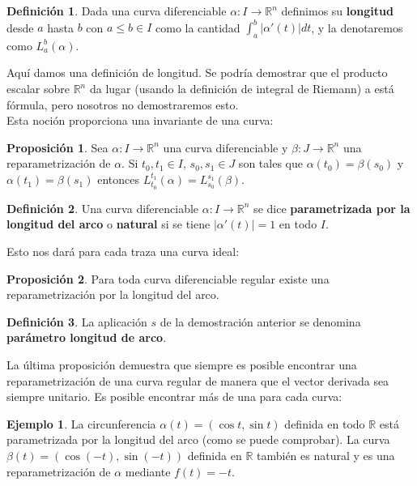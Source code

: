 \documentclass{article}
\theoremstyle{definition}
\newtheorem{prop}{Proposición}
\newtheorem{define}{Definición}
\newtheorem{ejem}{Ejemplo}
\newcommand{\reales}{\mathbb{R}}
\begin{document}
\begin{define}
	Dada una curva diferenciable $\alpha: I \rightarrow \reales^{n}$ definimos su \textbf{longitud} desde $a$ hasta $b$ con $a\leq b \in I$ como la cantidad $\int_a^b |\alpha' (t)| dt$, y la denotaremos como $L_{a}^{b} (\alpha)$. 
\end{define}

Aquí damos una definición de longitud. Se podría demostrar que el producto escalar sobre $\reales^{n}$ da lugar (usando la definición de integral de Riemann) a está fórmula, pero nosotros no demostraremos esto.\\ 
Esta noción proporciona una invariante de una curva:

\begin{prop}
	Sea $\alpha: I \rightarrow \reales^{n}$ una curva diferenciable y $\beta: J \rightarrow \reales^{n}$ una reparametrización de $\alpha$. Si $t_0, t_1 \in I$, $s_0, s_1 \in J$ son tales que $\alpha(t_0) = \beta(s_0)$ y $\alpha(t_1) = \beta(s_1)$ entonces $L_{t_0}^{t_1} (\alpha) = L_{s_0}^{s_1} (\beta)$.
\end{prop}

\begin{define}
	Una curva diferenciable $\alpha: I \rightarrow \reales^{n}$ se dice \textbf{parametrizada por la longitud del arco} o \textbf{natural} si se tiene $|\alpha' (t)| = 1$ en todo $I$.
\end{define}

Esto nos dará para cada traza una curva ideal:

\begin{prop}	
	Para toda curva diferenciable regular existe una reparametrización por la longitud del arco.
\end{prop}

\begin{define}
	La aplicación $s$ de la demostración anterior se denomina \textbf{parámetro longitud de arco}.
\end{define}

La última proposición demuestra que siempre es posible encontrar una reparametrización de una curva regular de manera que el vector derivada sea siempre unitario. Es posible encontrar más de una para cada curva:

\begin{ejem}
	La circunferencia $\alpha(t) = (\cos t, \sin t)$ definida en todo $\reales$ está parametrizada por la longitud del arco (como se puede comprobar). La curva $\beta(t) = (\cos (-t), \sin (-t))$ definida en $\reales$ también es natural y es una reparametrización de $\alpha$ mediante $f(t) = -t$. 
\end{ejem}
\end{document}

